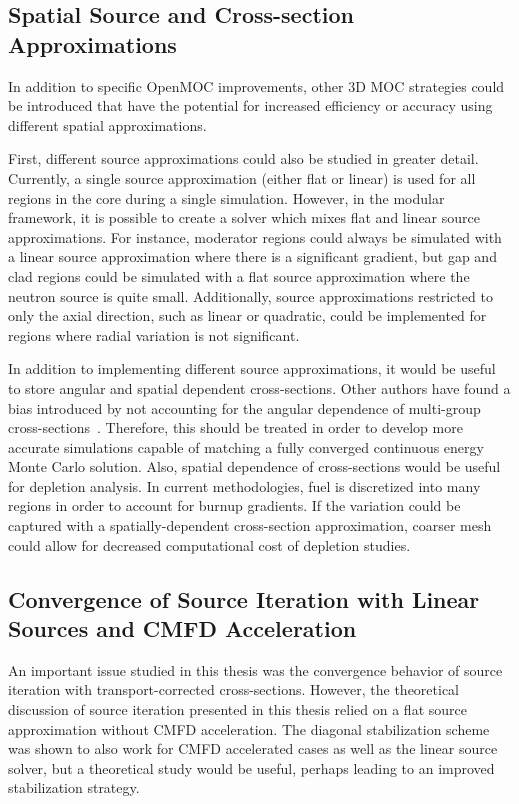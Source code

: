 \subsection{Spatial Source and Cross-section Approximations}

In addition to specific OpenMOC improvements, other 3D \ac{MOC} strategies could be introduced that have the potential for increased efficiency or accuracy using different spatial approximations.

First, different source approximations could also be studied in greater detail. Currently, a single source approximation (either flat or linear) is used for all regions in the core during a single simulation. However, in the modular framework, it is possible to create a solver which mixes flat and linear source approximations. For instance, moderator regions could always be simulated with a linear source approximation where there is a significant gradient, but gap and clad regions could be simulated with a flat source approximation where the neutron source is quite small. Additionally, source approximations restricted to only the axial direction, such as linear or quadratic, could be implemented for regions where radial variation is not significant.

In addition to implementing different source approximations, it would be useful to store angular and spatial dependent cross-sections. Other authors have found a bias introduced by not accounting for the angular dependence of multi-group cross-sections~\cite{gibson-preprint}. Therefore, this should be treated in order to develop more accurate simulations capable of matching a fully converged continuous energy Monte Carlo solution. Also, spatial dependence of cross-sections would be useful for depletion analysis. In current methodologies, fuel is discretized into many regions in order to account for burnup gradients. If the variation could be captured with a spatially-dependent cross-section approximation, coarser mesh could allow for decreased computational cost of depletion studies.

\subsection{Convergence of Source Iteration with Linear Sources and CMFD Acceleration}

An important issue studied in this thesis was the convergence behavior of source iteration with transport-corrected cross-sections. However, the theoretical discussion of source iteration presented in this thesis relied on a flat source approximation without \ac{CMFD} acceleration. The diagonal stabilization scheme was shown to also work for \ac{CMFD} accelerated cases as well as the linear source solver, but a theoretical study would be useful, perhaps leading to an improved stabilization strategy.



